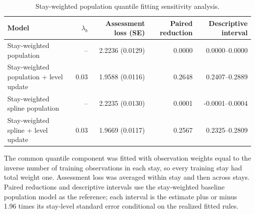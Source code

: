 \begin{table}[!htbp]
\caption{Stay-weighted population quantile fitting sensitivity analysis.}
\label{tab:stay_weighted_population_sensitivity}
\centering
\small
\begin{tabular}{lrrrr}
\hline
Model & $\lambda_b$ & Assessment loss (SE) & Paired reduction & Descriptive interval\\
\hline
Stay-weighted population & -- & 2.2236 (0.0129) & 0.0000 & 0.0000--0.0000\\
Stay-weighted population + level update & 0.03 & 1.9588 (0.0116) & 0.2648 & 0.2407--0.2889\\
Stay-weighted spline population & -- & 2.2235 (0.0130) & 0.0001 & -0.0001--0.0004\\
Stay-weighted spline + level update & 0.03 & 1.9669 (0.0117) & 0.2567 & 0.2325--0.2809\\
\hline
\end{tabular}
\par\smallskip
\footnotesize{The common quantile component was fitted with observation weights equal to the inverse number of training observations in each stay, so every training stay had total weight one. Assessment loss was averaged within stay and then across stays. Paired reductions and descriptive intervals use the stay-weighted baseline population model as the reference; each interval is the estimate plus or minus 1.96 times its stay-level standard error conditional on the realized fitted rules.}
\end{table}

